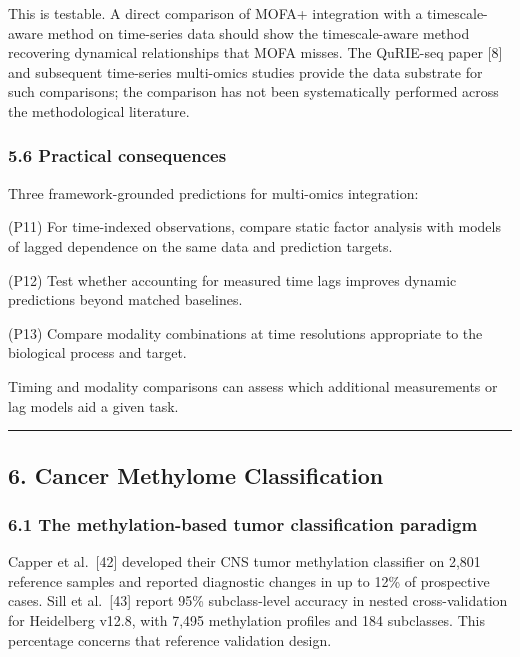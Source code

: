 \documentclass[
]{article}
\begin{document}
This is testable. A direct comparison of MOFA+ integration with a
timescale-aware method on time-series data should show the
timescale-aware method recovering dynamical relationships that MOFA
misses. The QuRIE-seq paper {[}8{]} and subsequent time-series
multi-omics studies provide the data substrate for such comparisons; the
comparison has not been systematically performed across the
methodological literature.

\hypertarget{practical-consequences-3}{%
\subsubsection{5.6 Practical
consequences}\label{practical-consequences-3}}

Three framework-grounded predictions for multi-omics integration:

(P11) For time-indexed observations, compare static factor analysis with
models of lagged dependence on the same data and prediction targets.

(P12) Test whether accounting for measured time lags improves dynamic
predictions beyond matched baselines.

(P13) Compare modality combinations at time resolutions appropriate to
the biological process and target.

Timing and modality comparisons can assess which additional measurements
or lag models aid a given task.

\begin{center}\rule{0.5\linewidth}{0.5pt}\end{center}

\hypertarget{cancer-methylome-classification}{%
\subsection{6. Cancer Methylome
Classification}\label{cancer-methylome-classification}}

\hypertarget{the-methylation-based-tumor-classification-paradigm}{%
\subsubsection{6.1 The methylation-based tumor classification
paradigm}\label{the-methylation-based-tumor-classification-paradigm}}

Capper et al.~{[}42{]} developed their CNS tumor methylation classifier
on 2,801 reference samples and reported diagnostic changes in up to 12\%
of prospective cases. Sill et al.~{[}43{]} report 95\% subclass-level
accuracy in nested cross-validation for Heidelberg v12.8, with 7,495
methylation profiles and 184 subclasses. This percentage concerns that
reference validation design.
\end{document}
